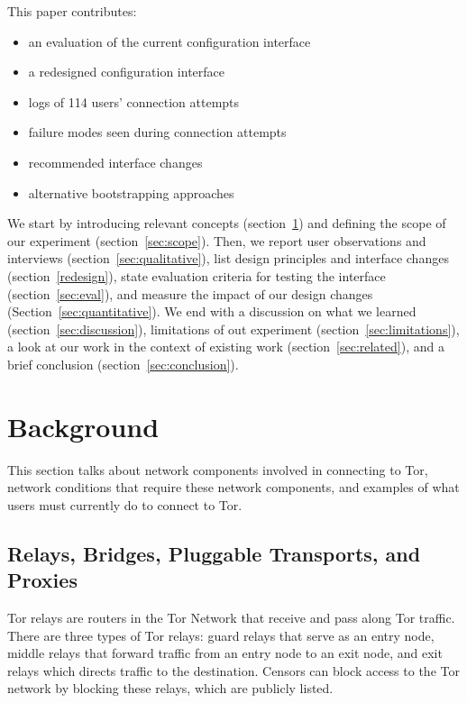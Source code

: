 \documentclass[USenglish,oneside,twocolumn]{article}
\begin{document}
\noindent This paper contributes:
\smallskip
\begin{itemize}
\item an evaluation of the current configuration interface
\item a redesigned configuration interface
\item logs of 114 users' connection attempts
\item failure modes seen during connection attempts
\item recommended interface changes
\item alternative bootstrapping approaches
\end{itemize}

We start by introducing relevant concepts (section~\ref{sec:background}) and
defining the scope of our experiment (section~\ref{sec:scope}). 
Then, we report user observations and interviews (section~\ref{sec:qualitative}),
list design principles and interface changes (section~\ref{redesign}),
state evaluation criteria for testing the interface (section~\ref{sec:eval}), 
and measure the impact of our design changes (Section~\ref{sec:quantitative}).
We end with a discussion on what we learned (section~\ref{sec:discussion}),
limitations of out experiment (section~\ref{sec:limitations}), 
a look at our work in the context of existing work (section~\ref{sec:related}), and
a brief conclusion (section~\ref{sec:conclusion}).

\section{Background}
\label{sec:background}
This section talks about network components involved in connecting to Tor, network conditions that require these network components, and examples of what users must currently do to connect to Tor. 

\subsection{Relays, Bridges, Pluggable Transports, and Proxies} 

Tor relays are routers in the Tor Network that receive and pass along Tor traffic. 
There are three types of Tor relays: guard relays that serve as an entry node, middle relays that forward traffic from an entry node to an exit node, and exit relays which directs traffic to the destination. 
Censors can block access to the Tor network by blocking these relays, which are publicly listed. 
\end{document}

